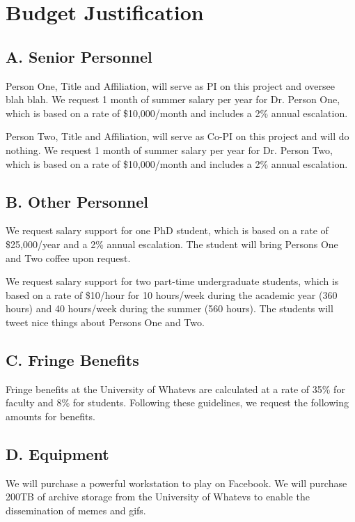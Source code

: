 
\section*{Budget Justification}

\subsection*{A. Senior Personnel}

 Person One, Title and Affiliation, will serve as PI on this project and oversee blah blah. We request 1 month of summer salary per year for Dr. Person One, which is based on a rate of \$10,000/month and includes a 2\% annual escalation.

 Person Two, Title and Affiliation, will serve as Co-PI on this project and will do nothing. We request 1 month of summer salary per year for Dr. Person Two, which is based on a rate of \$10,000/month and includes a 2\% annual escalation.

\subsection*{B. Other Personnel}
 We request salary support for one PhD student, which is based on a rate of \$25,000/year and a 2\% annual escalation. The student will bring Persons One and Two coffee upon request.

 We request salary support for two part-time undergraduate students, which is based on a rate of \$10/hour for 10 hours/week during the academic year (360 hours) and 40 hours/week during the summer (560 hours). The students will tweet nice things about Persons One and Two.

\subsection*{C. Fringe Benefits}
Fringe benefits at the University of Whatevs are calculated at a rate of 35\% for faculty and 8\% for students. Following these guidelines, we request the following amounts for benefits.

\subsection*{D. Equipment}
We will purchase a powerful workstation to play on Facebook. We will purchase 200TB of archive storage from the University of Whatevs to enable the dissemination of memes and gifs.

